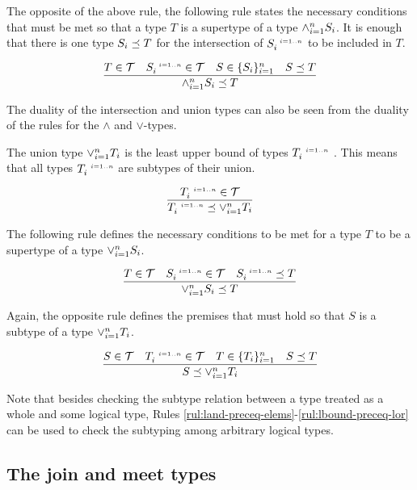 \documentclass[runningheads]{llncs}
\newcommand{\s}{\scriptscriptstyle\ \,}
\newcommand{\T}{{\cal T}}
\begin{document}
The opposite of the above rule, the following rule states the
necessary conditions that must be met so that a type $T$ is a
supertype of a type $\land_{i=1}^n\/S_i$. It is enough that there is
one type $S_i\preceq\/T$ for the intersection of $S_i^{\s\/i=1..n}$ to
be included in $T$.

\begin{equation}
\label{rul:land-preceq-ubound}
\dfrac{T\in\T\quad\/S_i^{\s\/i=1..n}\in\T\quad\/S\in\{S_i\}_{i=1}^n\quad\/S\preceq\/T}
      {\land_{i=1}^n\/S_i\preceq\/T}  
\end{equation} 

The duality of the intersection and union types can also be seen from
the duality of the rules for the $\land$ and $\lor$-types.

The union type $\lor_{i=1}^n\/T_i$ is the least upper bound of types
$T_i^{\s\/i=1..n}$ \cite{Pierce1991}. This means that all types
$T_i^{\s\/i=1..n}$ are subtypes of their union.

\begin{equation}
\label{rul:lor-preceq-elems}
\dfrac{T_i^{\s\/i=1..n}\in\T}
      {T_i^{\s\/i=1..n}\preceq\lor_{i=1}^n\/T_i}
\end{equation}

The following rule defines the necessary conditions to be met for a
type $T$ to be a supertype of a type $\lor_{i=1}^n\/S_i$.

\begin{equation}
\label{rul:lor-preceq-ubound}
\dfrac{T\in\T\quad\/S_i^{\s\/i=1..n}\in\T\quad\/S_i^{\s\/i=1..n}\preceq\/T}
      {\lor_{i=1}^n\/S_i\preceq\/T}  
\end{equation}

Again, the opposite rule defines the premises that must hold so that
$S$ is a subtype of a type $\lor_{i=1}^n\/T_i$.

\begin{equation}
\label{rul:lbound-preceq-lor}
\dfrac{S\in\T\quad\/T_i^{\s\/i=1..n}\in\T\quad\/T\in\{T_i\}_{i=1}^n\quad\/S\preceq\/T}
      {S\preceq\lor_{i=1}^n\/T_i}  
\end{equation}

Note that besides checking the subtype relation between a type treated
as a whole and some logical type, Rules
\ref{rul:land-preceq-elems}-\ref{rul:lbound-preceq-lor} can be used to
check the subtyping among arbitrary logical types.






\subsection{The join and meet types\label{sec:join-meet-types}}
\end{document}
